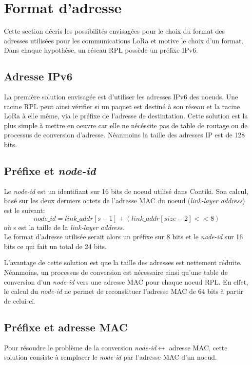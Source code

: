 \section{Format d'adresse}\label{sec:archi-adresses}
\renewcommand{\rightmark}{Format d'adresse}

Cette section décris les possibilités envisagées pour le choix du format des adresses utilisées pour les communications LoRa et motive le choix d'un format. Dans chaque hypothèse, un réseau RPL possède un préfixe IPv6.

\subsection*{Adresse IPv6}
    La première solution envisagée est d'utiliser les adresses IPv6 des noeuds.
    Une racine RPL peut ainsi vérifier si un paquet est destiné à son réseau et la racine LoRa à elle même,
    via le préfixe de l'adresse de destintation.
    Cette solution est la plus simple à mettre en oeuvre car elle ne nécéssite pas de table de routage ou de processus de conversion d'adresse. Néanmoins la taille des adresses IP est de 128 bits.

\subsection*{Préfixe et \textit{node-id}}
    Le \textit{node-id} est un identifiant sur 16 bits de noeud utilisé dans Contiki. Son calcul, basé sur les deux derniers octets de l'adresse MAC du noeud (\textit{link-layer address}) est le suivant:
    \[
        node\_id = link\_addr[s-1] + (link\_addr[size -2] << 8)
    \]
    où s est la taille de la \textit{link-layer address}.\\

    Le format d'adresse utilisée serait alors un préfixe sur 8 bits et le \textit{node-id} sur 16 bits ce qui fait un total de 24 bits.

    L'avantage de cette solution est que la taille des adresses est nettement réduite. Néanmoins, un processus de conversion est nécessaire ainsi qu'une table de conversion d'un \textit{node-id} vers une adresse MAC pour chaque noeud RPL. En effet, le calcul du \textit{node-id} ne permet de reconstituer l'adresse MAC de 64 bits à partir de celui-ci.

\subsection*{Préfixe et adresse MAC}
    Pour résoudre le problème de la conversion \textit{node-id}$\leftrightarrow	$ adresse MAC, cette solution consiste à remplacer le \textit{node-id} par l'adresse MAC d'un noeud.

